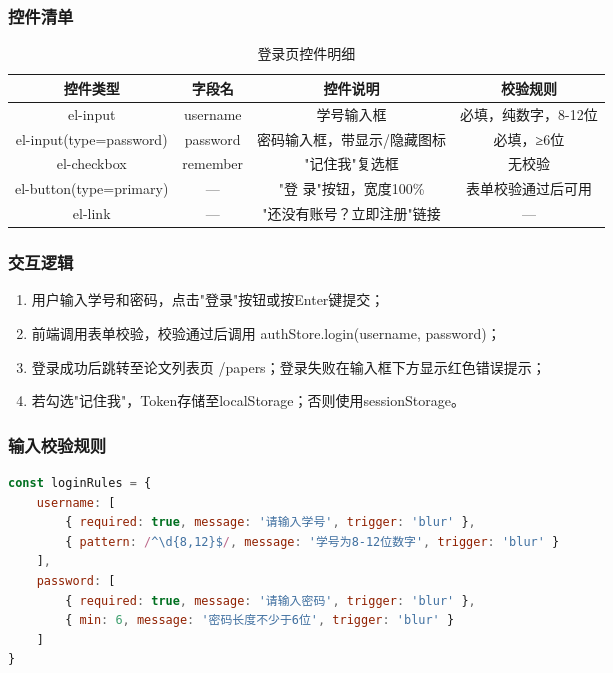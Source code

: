 \documentclass{../../softeng}
\begin{document}
\subsubsection{控件清单}
\begin{table}[htbp]
    \centering
    \caption{登录页控件明细}
    \begin{tabular}{|c|c|c|c|}
        \hline
        \textbf{控件类型} & \textbf{字段名} & \textbf{控件说明} & \textbf{校验规则} \\
        \hline
        el-input & username & 学号输入框 & 必填，纯数字，8-12位 \\
        \hline
        el-input(type=password) & password & 密码输入框，带显示/隐藏图标 & 必填，≥6位 \\
        \hline
        el-checkbox & remember & "记住我"复选框 & 无校验 \\
        \hline
        el-button(type=primary) & — & "登 录"按钮，宽度100\% & 表单校验通过后可用 \\
        \hline
        el-link & — & "还没有账号？立即注册"链接 & — \\
        \hline
    \end{tabular}
\end{table}

\subsubsection{交互逻辑}
\begin{enumerate}
    \item 用户输入学号和密码，点击"登录"按钮或按Enter键提交；
    \item 前端调用表单校验，校验通过后调用 authStore.login(username, password)；
    \item 登录成功后跳转至论文列表页 /papers；登录失败在输入框下方显示红色错误提示；
    \item 若勾选"记住我"，Token存储至localStorage；否则使用sessionStorage。
\end{enumerate}

\subsubsection{输入校验规则}
\begin{lstlisting}[language=JavaScript]
const loginRules = {
    username: [
        { required: true, message: '请输入学号', trigger: 'blur' },
        { pattern: /^\d{8,12}$/, message: '学号为8-12位数字', trigger: 'blur' }
    ],
    password: [
        { required: true, message: '请输入密码', trigger: 'blur' },
        { min: 6, message: '密码长度不少于6位', trigger: 'blur' }
    ]
}
\end{lstlisting}
\end{document}
